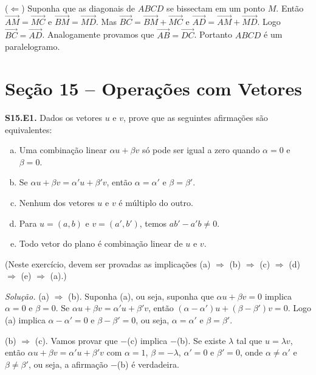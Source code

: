 \documentclass[a4paper,11pt]{article}
\begin{document}
($\Leftarrow$)
Suponha que as diagonais de $ABCD$ se bissectam em um ponto $M$.
Então $\overrightarrow{AM} = \overrightarrow{MC}$ e $\overrightarrow{BM} = \overrightarrow{MD}$.
Mas $\overrightarrow{BC} = \overrightarrow{BM} + \overrightarrow{MC}$ e $\overrightarrow{AD} = \overrightarrow{AM} + \overrightarrow{MD}$.
Logo $\overrightarrow{BC} = \overrightarrow{AD}$.
Analogamente provamos que $\overrightarrow{AB} = \overrightarrow{DC}$.
Portanto $ABCD$ é um paralelogramo.

\section*{Seção 15 -- Operações com Vetores}

\textbf{S15.E1.}
Dados os vetores $u$ e $v$, prove que as seguintes afirmações são equivalentes:
\begin{enumerate}[(a)]
  \item
    Uma combinação linear $\alpha u + \beta v$ só pode ser igual a zero quando $\alpha = 0$ e $\beta = 0$.
  \item
    Se $\alpha u + \beta v = \alpha' u + \beta' v$, então $\alpha = \alpha'$ e $\beta = \beta'$.
  \item
    Nenhum dos vetores $u$ e $v$ é múltiplo do outro.
  \item
    Para $u = (a, b)$ e $v = (a', b')$, temos $a b' - a' b \neq 0$.
  \item
    Todo vetor do plano é combinação linear de $u$ e $v$.
\end{enumerate}
(Neste exercício, devem ser provadas as implicações (a) $\Rightarrow$ (b) $\Rightarrow$ (c) $\Rightarrow$ (d) $\Rightarrow$ (e) $\Rightarrow$ (a).)

\vspace{\baselineskip}

\emph{Solução.}
(a) $\Rightarrow$ (b).
Suponha (a), ou seja, suponha que $\alpha u + \beta v = 0$ implica $\alpha = 0$ e $\beta = 0$.
Se $\alpha u + \beta v = \alpha' u + \beta' v$, então $(\alpha - \alpha')u + (\beta - \beta') v = 0$.
Logo (a) implica $\alpha - \alpha' = 0$ e $\beta - \beta' = 0$, ou seja, $\alpha = \alpha'$ e $\beta = \beta'$.

(b) $\Rightarrow$ (c).
Vamos provar que $-$(c) implica $-$(b).
Se existe $\lambda$ tal que $u = \lambda v$, então $\alpha u + \beta v = \alpha' u + \beta' v$ com $\alpha = 1$, $\beta = -\lambda$, $\alpha' = 0$ e $\beta' = 0$, onde $\alpha \neq \alpha'$ e $\beta \neq \beta'$, ou seja, a afirmação $-$(b) é verdadeira.
\end{document}
